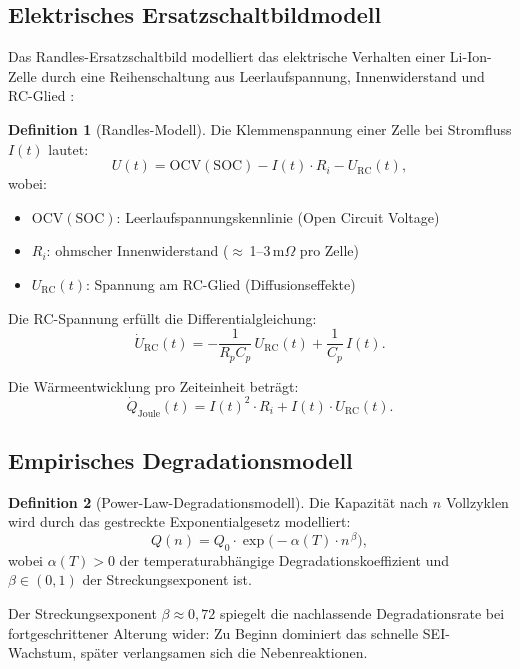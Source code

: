 ﻿\documentclass[a4paper,12pt]{article}
\theoremstyle{definition}
\newtheorem{definition}{Definition}
\begin{document}
\subsection{Elektrisches Ersatzschaltbildmodell}

Das Randles-Ersatzschaltbild modelliert das elektrische Verhalten einer
Li-Ion-Zelle durch eine Reihenschaltung aus Leerlaufspannung, Innenwiderstand
und RC-Glied \cite{Plett2015}:

\begin{definition}[Randles-Modell]
  Die Klemmenspannung einer Zelle bei Stromfluss $I(t)$ lautet:
  \[
    U(t) = \mathrm{OCV}(\mathrm{SOC}) - I(t)\cdot R_i - U_{\mathrm{RC}}(t),
  \]
  wobei:
  \begin{itemize}
    \item $\mathrm{OCV}(\mathrm{SOC})$: Leerlaufspannungskennlinie (Open Circuit Voltage)
    \item $R_i$: ohmscher Innenwiderstand ($\approx$\,1--3\,m$\Omega$ pro Zelle)
    \item $U_{\mathrm{RC}}(t)$: Spannung am RC-Glied (Diffusionseffekte)
  \end{itemize}
  Die RC-Spannung erf\"ullt die Differentialgleichung:
  \[
    \dot{U}_{\mathrm{RC}}(t) = -\frac{1}{R_p C_p}\,U_{\mathrm{RC}}(t) + \frac{1}{C_p}\,I(t).
  \]
\end{definition}

Die W\"armeentwicklung pro Zeiteinheit betr\"agt:
\[
  \dot{Q}_{\mathrm{Joule}}(t) = I(t)^2 \cdot R_i + I(t)\cdot U_{\mathrm{RC}}(t).
\]

\subsection{Empirisches Degradationsmodell}

\begin{definition}[Power-Law-Degradationsmodell]
  Die Kapazit\"at nach $n$ Vollzyklen wird durch das gestreckte
  Exponentialgesetz modelliert:
  \[
    Q(n) = Q_0 \cdot \exp\!\bigl(-\alpha(T) \cdot n^{\,\beta}\bigr),
  \]
  wobei $\alpha(T) > 0$ der temperaturabh\"angige Degradationskoeffizient
  und $\beta \in (0,1)$ der Streckungsexponent ist.
\end{definition}

Der Streckungsexponent $\beta \approx 0{,}72$ spiegelt die nachlassende
Degradationsrate bei fortgeschrittener Alterung wider: Zu Beginn dominiert
das schnelle SEI-Wachstum, sp\"ater verlangsamen sich die Nebenreaktionen.
\end{document}
